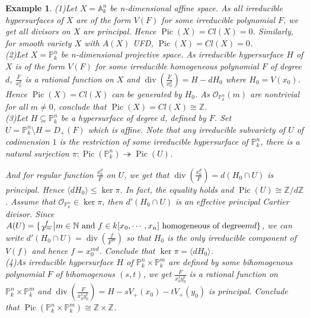 \documentclass{ctexart}
\newtheorem{example}{Example}[section]
\newcommand{\picardscheme}{\operatorname{Pic}}
\newcommand{\divisor}{\operatorname{div}}
\begin{document}
\begin{example}
    (1)Let $X = \mathbb{A}_{k}^{n}$ be n-dimensional affine space.
    As all irreducible hypersurfaces of $X$ are of the form $V(F)$ for some irreducible polynomial $F$, we get all divisors on $X$ are principal.
    Hence $\picardscheme (X) = Cl(X) = 0$.
    Similarly, for smooth variety $X$ with $A(X)$ UFD, $\picardscheme (X) = Cl(X) = 0$. \\
    (2)Let $X = \mathbb{P}_{k}^{n}$ be n-dimensional projective space.
    As irreducible hypersurface $H$ of $X$ is of the form $V(F)$ for some irreducible homogeneous polynomial $F$ of degree $d$,
    $\frac{F}{x_{0}^{d}}$ is a rational function on $X$ and $\divisor (\frac{F}{x_{0}^{d}}) = H - dH_{0}$ where $H_{0} = V(x_{0})$.
    Hence $\picardscheme (X) = Cl(X)$ can be generated by $H_{0}$.
    As $\mathcal{O}_{\mathbb{P}_{k}^{n}}(m)$ are nontrivial for all $m \neq 0$, conclude that $\picardscheme (X) = Cl(X) \cong \mathbb{Z}$. \\
    (3)Let $H \subseteq \mathbb{P}_{k}^{n}$ be a hypersurface of degree $d$, defined by $F$.
    Set $U = \mathbb{P}_{k}^{n} \setminus H = D_{+}(F)$ which is affine.
    Note that any irreducible subvariety of $U$ of codimension $1$ is the restriction of some irreducible hypersurface of $\mathbb{P}_{k}^{n}$,
    there is a natural surjection $\pi: \picardscheme (\mathbb{P}_{k}^{n}) \twoheadrightarrow \picardscheme (U)$.
    \par
    And for regular function $\frac{x_{0}^{d}}{F}$ on $U$, we get that $\divisor (\frac{x_{0}^{d}}{F}) = d(H_{0} \cap U)$ is principal.
    Hence $\langle dH_{0} \rangle \le \ker \pi$.
    In fact, the equality holds and $\picardscheme (U) \cong \mathbb{Z}/d\mathbb{Z}$.
    Assume that $\mathcal{O}_{\mathbb{P}_{k}^{n}}\in \ker \pi$, then $d'(H_{0} \cap U)$ is an effective principal Cartier divisor.
    Since $A(U) = \{\frac{f}{F^{m}} \big{|} m\in \mathbb{N} \text{ and } f\in k[x_{0}, \cdots, x_{n}] \text{ homogeneous of degree} md\}$,
    we can write $d'(H_{0} \cap U) = \divisor (\frac{f}{F^{m}})$ so that $H_{0}$ is the only irreducible component of $V(f)$ and hence $f = x_{0}^{md}$.
    Conclude that $\ker \pi = \langle dH_{0} \rangle$. \\
    (4)As irreducible hypersurface $H$ of $\mathbb{P}_{k}^{n} \times \mathbb{P}_{k}^{m}$ are defined by some bihomogenous polynomial $F$ of bihomogenous $(s, t)$,
    we get $\frac{F}{x_{0}^{s}y_{0}^{t}}$ is a rational function on $\mathbb{P}_{k}^{n} \times \mathbb{P}_{k}^{m}$ and $\divisor (\frac{F}{x_{0}^{s}y_{0}^{t}}) = H - sV_{+}(x_{0}) - tV_{+}(y_{0})$ is principal.
    Conclude that $\picardscheme (\mathbb{P}_{k}^{n} \times \mathbb{P}_{k}^{m}) \cong \mathbb{Z} \times \mathbb{Z}$.
    \label{example:picard_group}
\end{example}
\end{document}
